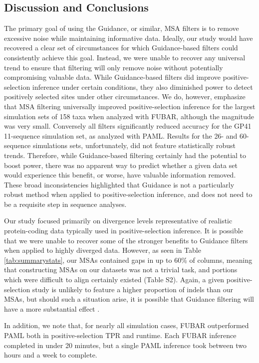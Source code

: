 \documentclass[11pt]{article}
\begin{document}
\subsection*{Discussion and Conclusions}

The primary goal of using the Guidance, or similar, MSA filters is to remove excessive noise while maintaining informative data. Ideally, our study would have recovered a clear set of circumstances for which Guidance-based filters could consistently achieve this goal. Instead, we were unable to recover any universal trend to ensure that filtering will only remove noise without potentially compromising valuable data. While Guidance-based filters did improve positive-selection inference under certain conditions, they also diminished power to detect positively selected sites under other circumstances. We do, however, emphasize that MSA filtering universally improved positive-selection inference for the largest simulation sets of 158 taxa when analyzed with FUBAR, although the magnitude was very small. Conversely all filters significantly reduced accuracy for the GP41 11-sequence simulation set, as analyzed with PAML. Results for the 26- and 60-sequence simulations sets, unfortunately, did not feature statistically robust trends. Therefore, while Guidance-based filtering certainly had the potential to boost power, there was no apparent way to predict whether a given data set would experience this benefit, or worse, have valuable information removed. These broad inconsistencies highlighted that Guidance is not a particularly robust method when applied to positive-selection inference, and does not need to be a requisite step in sequence analyses.

Our study focused primarily on divergence levels representative of realistic protein-coding data typically used in positive-selection inference. It is possible that we were unable to recover some of the stronger benefits to Guidance filters when applied to highly diverged data. However, as seen in Table \ref{tab:summarystats}, our MSAs contained gaps in up to 60\% of columns, meaning that constructing MSAs on our datasets was not a trivial task, and portions which were difficult to align certainly existed (Table S2). Again, a given positive-selection study is unlikely to feature a higher proportion of indels than our MSAs, but should such a situation arise, it is possible that Guidance filtering will have a more substantial effect \citep{Privman2012}.

In addition, we note that, for nearly all simulation cases, FUBAR outperformed PAML both in positive-selection TPR and runtime. Each FUBAR inference completed in under 20 minutes, but a single PAML inference took between two hours and a week to complete. 
\end{document}
